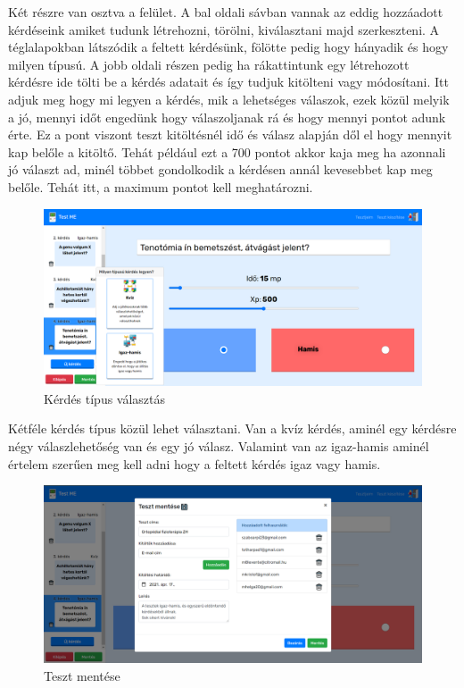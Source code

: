 Két részre van osztva a felület. A bal oldali sávban vannak az eddig hozzáadott kérdéseink amiket tudunk létrehozni, törölni, kiválasztani majd szerkeszteni. A téglalapokban látszódik a feltett kérdésünk, fölötte pedig hogy hányadik és hogy milyen típusú. A jobb oldali részen pedig ha rákattintunk egy létrehozott kérdésre ide tölti be a kérdés adatait és így tudjuk kitölteni vagy módosítani. Itt adjuk meg hogy mi legyen a kérdés, mik a lehetséges válaszok, ezek közül melyik a jó, mennyi időt engedünk hogy válaszoljanak rá és hogy mennyi pontot adunk érte. Ez a pont viszont teszt kitöltésnél idő és válasz alapján dől el hogy mennyit kap belőle a kitöltő. Tehát például ezt a 700 pontot akkor kaja meg ha azonnali jó választ ad, minél többet gondolkodik a kérdésen annál kevesebbet kap meg belőle. Tehát itt, a maximum pontot kell meghatározni.

\begin{figure}[H]
    \centering
    \includegraphics[width=\linewidth]{images/make_test2.png}
    \caption{Kérdés típus választás}
\end{figure}

Kétféle kérdés típus közül lehet választani. Van a kvíz kérdés, aminél egy kérdésre négy válaszlehetőség van és egy jó válasz. Valamint van az igaz-hamis aminél értelem szerűen meg kell adni hogy a feltett kérdés igaz vagy hamis.


\begin{figure}[H]
    \centering
    \includegraphics[width=\linewidth]{images/make_test3.png}
    \caption{Teszt mentése}
\end{figure}

